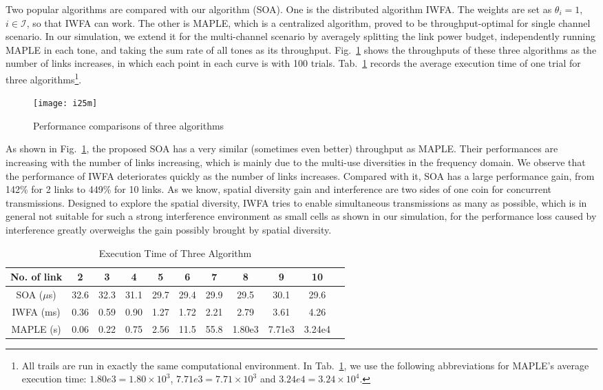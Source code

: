 \documentclass[conference]{IEEEtran}
\newcommand{\mi}{\mathcal{I}}
\begin{document}
Two popular algorithms are compared with our algorithm (SOA). One is the  distributed algorithm IWFA. The weights are set as $\theta_i=1,$ $i\in\mi$, so that IWFA can work. The other is MAPLE\cite{qian2009maple}, which is a centralized algorithm, proved to be throughput-optimal for single channel scenario. In our simulation, we extend it for the multi-channel scenario by averagely splitting the link power budget, independently running MAPLE in each tone, and taking the sum rate of all tones as its throughput. Fig.~\ref{fig:simulation} shows the throughputs of these three algorithms as the number of links increases, in which each point in each curve is with 100 trials. Tab.~\ref{tab:time} records the average execution time of one trial for three algorithms\footnote{All trails are run in exactly the same computational environment. In Tab.~\ref{tab:time}, we use the following abbreviations for MAPLE's average execution time: $1.80e3=1.80\times 10^3$, $7.71e3=7.71\times 10^3$ and $3.24e4=3.24\times 10^4$.}.
\begin{figure}[htb]
\centering
\texttt{[image: i25m]}
\caption{Performance comparisons of three algorithms}
\label{fig:simulation}
\end{figure}




As shown in Fig.~\ref{fig:simulation}, the proposed SOA has a very similar (sometimes even better) throughput as MAPLE. Their performances are increasing with the number of links increasing, which  is mainly due to the multi-use diversities in the frequency domain. We observe that the performance of IWFA deteriorates quickly as the number of links increases. Compared with it, SOA has a large performance gain, from 142\% for 2 links to 449\% for 10 links. As we know, spatial diversity gain and interference are two sides of one coin for concurrent transmissions. Designed to explore the spatial diversity, IWFA tries to enable simultaneous transmissions as many as possible, which is in general not suitable for such a strong interference environment as small cells as shown in our simulation, for the performance loss caused by interference greatly overweighs the gain possibly brought by spatial diversity. 

\begin{table}[tb]
\centering
\begin{tabular}{|c|c|c|c|c|c|c|c|c|c|c|}
\hline
No. of link& 2&3&4&5&6&7&8&9&10\\
\hline
SOA ($\mu$s)&32.6&32.3&31.1&29.7&29.4&29.9&29.5&30.1&29.6\\
\hline
IWFA (ms)&0.36&0.59&0.90&1.27&1.72&2.21&2.79&3.61&4.26\\
\hline
MAPLE (s)&0.06&0.22&0.75&2.56&11.5&55.8&1.80e3&7.71e3&3.24e4\\
\hline
\end{tabular}
\caption{Execution Time of Three Algorithm}
\label{tab:time}
\end{table}
\end{document}
